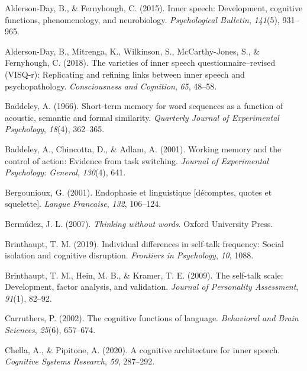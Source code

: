 \documentclass[
  man,a4paper,floatsintext]{apa6}
\newlength{\cslhangindent}
\newlength{\cslentryspacingunit} %
\newenvironment{CSLReferences}[2] %
 {%
  \setlength{\parindent}{0pt}
  \ifodd #1
  \let\oldpar\par
  \def\par{\hangindent=\cslhangindent\oldpar}
  \fi
  \setlength{\parskip}{#2\cslentryspacingunit}
 }%
 {}
\begin{document}
\hypertarget{refs}{}
\begin{CSLReferences}{1}{0}
\leavevmode{}%
Alderson-Day, B., \& Fernyhough, C. (2015). Inner speech: Development, cognitive functions, phenomenology, and neurobiology. \emph{Psychological Bulletin}, \emph{141}(5), 931--965.

\leavevmode{}%
Alderson-Day, B., Mitrenga, K., Wilkinson, S., McCarthy-Jones, S., \& Fernyhough, C. (2018). The varieties of inner speech questionnaire--revised (VISQ-r): Replicating and refining links between inner speech and psychopathology. \emph{Consciousness and Cognition}, \emph{65}, 48--58.

\leavevmode{}%
Baddeley, A. (1966). Short-term memory for word sequences as a function of acoustic, semantic and formal similarity. \emph{Quarterly Journal of Experimental Psychology}, \emph{18}(4), 362--365.

\leavevmode{}%
Baddeley, A., Chincotta, D., \& Adlam, A. (2001). Working memory and the control of action: Evidence from task switching. \emph{Journal of Experimental Psychology: General}, \emph{130}(4), 641.

\leavevmode{}%
Bergounioux, G. (2001). Endophasie et linguistique {[}décomptes, quotes et squelette{]}. \emph{Langue Francaise}, \emph{132}, 106--124.

\leavevmode{}%
Bermúdez, J. L. (2007). \emph{Thinking without words}. Oxford University Press.

\leavevmode{}%
Brinthaupt, T. M. (2019). Individual differences in self-talk frequency: Social isolation and cognitive disruption. \emph{Frontiers in Psychology}, \emph{10}, 1088.

\leavevmode{}%
Brinthaupt, T. M., Hein, M. B., \& Kramer, T. E. (2009). The self-talk scale: Development, factor analysis, and validation. \emph{Journal of Personality Assessment}, \emph{91}(1), 82--92.

\leavevmode{}%
Carruthers, P. (2002). The cognitive functions of language. \emph{Behavioral and Brain Sciences}, \emph{25}(6), 657--674.

\leavevmode{}%
Chella, A., \& Pipitone, A. (2020). A cognitive architecture for inner speech. \emph{Cognitive Systems Research}, \emph{59}, 287--292.


\end{CSLReferences}
\end{document}
